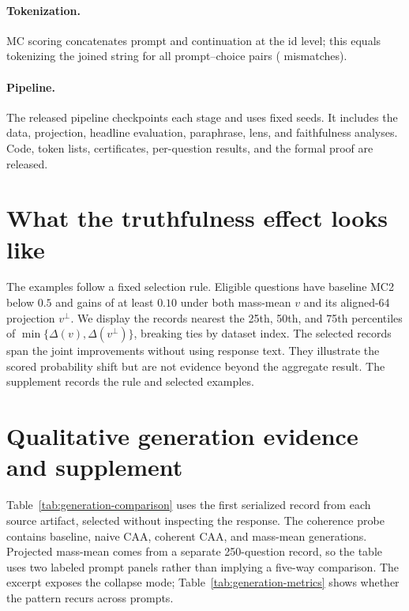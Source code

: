 \paragraph{Tokenization.} MC scoring concatenates prompt and continuation at the id level; this equals tokenizing the joined string for all \BpePairs{} prompt--choice pairs (\BpeMismatches{} mismatches).

\paragraph{Pipeline.} The released pipeline checkpoints each stage and uses fixed seeds. It includes the data, projection, headline evaluation, paraphrase, lens, and faithfulness analyses. Code, token lists, certificates, per-question results, and the formal proof are released.

\section{What the truthfulness effect looks like}\label{app:examples}

The examples follow a fixed selection rule. Eligible questions have baseline MC2 below $0.5$ and gains of at least $0.10$ under both mass-mean $v$ and its aligned-64 projection $v^{\perp}$. We display the records nearest the 25th, 50th, and 75th percentiles of $\min\{\Delta(v),\Delta(v^{\perp})\}$, breaking ties by dataset index. The selected records span the joint improvements without using response text. They illustrate the scored probability shift but are not evidence beyond the aggregate result. The supplement records the rule and selected examples.



\section{Qualitative generation evidence and supplement}\label{app:generations}

Table~\ref{tab:generation-comparison} uses the first serialized record from each source artifact, selected without inspecting the response. The coherence probe contains baseline, naive CAA, coherent CAA, and mass-mean generations. Projected mass-mean comes from a separate 250-question record, so the table uses two labeled prompt panels rather than implying a five-way comparison. The excerpt exposes the collapse mode; Table~\ref{tab:generation-metrics} shows whether the pattern recurs across prompts.

